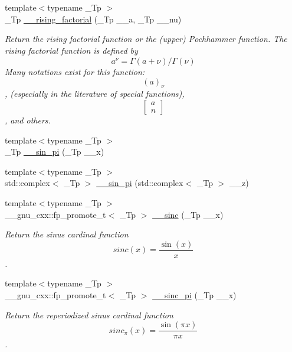 \begin{DoxyCompactItemize}
{\footnotesize template$<$typename \+\_\+\+Tp $>$ }\\\+\_\+\+Tp \hyperlink{namespacestd_1_1____detail_a109a13aa776d60bdc49b1cedc0e77670}{\+\_\+\+\_\+rising\+\_\+factorial} (\+\_\+\+Tp \+\_\+\+\_\+a, \+\_\+\+Tp \+\_\+\+\_\+nu)
\begin{DoxyCompactList}\small\item\em Return the rising factorial function or the (upper) Pochhammer function. The rising factorial function is defined by \[ a^{\overline{\nu}} = \Gamma(a + \nu) / \Gamma(\nu) \] Many notations exist for this function\+: \[ (a)_\nu \], (especially in the literature of special functions), \[ \left[ \begin{array}{c} a \\ n \end{array} \right] \], and others. \end{DoxyCompactList}\item 
{\footnotesize template$<$typename \+\_\+\+Tp $>$ }\\\+\_\+\+Tp \hyperlink{namespacestd_1_1____detail_a763249defff6377195818c2fc6e7bca2}{\+\_\+\+\_\+sin\+\_\+pi} (\+\_\+\+Tp \+\_\+\+\_\+x)
\item 
{\footnotesize template$<$typename \+\_\+\+Tp $>$ }\\std\+::complex$<$ \+\_\+\+Tp $>$ \hyperlink{namespacestd_1_1____detail_a5f26e85b3d646e5c69be173baebd4185}{\+\_\+\+\_\+sin\+\_\+pi} (std\+::complex$<$ \+\_\+\+Tp $>$ \+\_\+\+\_\+z)
\item 
{\footnotesize template$<$typename \+\_\+\+Tp $>$ }\\\+\_\+\+\_\+gnu\+\_\+cxx\+::fp\+\_\+promote\+\_\+t$<$ \+\_\+\+Tp $>$ \hyperlink{namespacestd_1_1____detail_ad0730b2b26df36cc8876a1152d895523}{\+\_\+\+\_\+sinc} (\+\_\+\+Tp \+\_\+\+\_\+x)
\begin{DoxyCompactList}\small\item\em Return the sinus cardinal function \[ sinc(x) = \frac{\sin(x)}{x} \]. \end{DoxyCompactList}\item 
{\footnotesize template$<$typename \+\_\+\+Tp $>$ }\\\+\_\+\+\_\+gnu\+\_\+cxx\+::fp\+\_\+promote\+\_\+t$<$ \+\_\+\+Tp $>$ \hyperlink{namespacestd_1_1____detail_ae73746d4ab5c5087c5d302e428490396}{\+\_\+\+\_\+sinc\+\_\+pi} (\+\_\+\+Tp \+\_\+\+\_\+x)
\begin{DoxyCompactList}\small\item\em Return the reperiodized sinus cardinal function \[ sinc_\pi(x) = \frac{\sin(\pi x)}{\pi x} \]. \end{DoxyCompactList}\item 

\end{DoxyCompactItemize}
